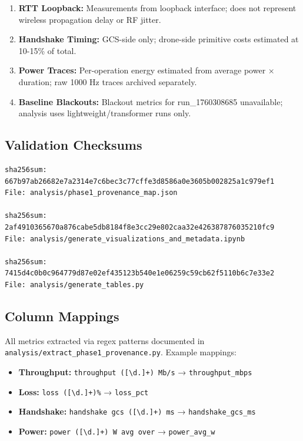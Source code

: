 \documentclass[11pt,a4paper]{article}
\begin{document}
\begin{enumerate}
    \item \textbf{RTT Loopback:} Measurements from loopback interface; does not represent wireless propagation delay or RF jitter.
    \item \textbf{Handshake Timing:} GCS-side only; drone-side primitive costs estimated at 10-15\% of total.
    \item \textbf{Power Traces:} Per-operation energy estimated from average power × duration; raw 1000 Hz traces archived separately.
    \item \textbf{Baseline Blackouts:} Blackout metrics for run\_1760308685 unavailable; analysis uses lightweight/transformer runs only.
\end{enumerate}

\subsection{Validation Checksums}

\begin{verbatim}
sha256sum: 667b97ab26682e7a2314e7c6bec3c77cffe3d8586a0e3605b002825a1c979ef1
File: analysis/phase1_provenance_map.json

sha256sum: 2af4910365670a876cabe5db8184f8e3cc29e802caa32e426387876035210fc9
File: analysis/generate_visualizations_and_metadata.ipynb

sha256sum: 7415d4c0b0c964779d87e02ef435123b540e1e06259c59cb62f5110b6c7e33e2
File: analysis/generate_tables.py
\end{verbatim}

\subsection{Column Mappings}

All metrics extracted via regex patterns documented in \texttt{analysis/extract\_phase1\_provenance.py}. Example mappings:
\begin{itemize}
    \item \textbf{Throughput:} \texttt{throughput ([\textbackslash d.]+) Mb/s} → \texttt{throughput\_mbps}
    \item \textbf{Loss:} \texttt{loss ([\textbackslash d.]+)\%} → \texttt{loss\_pct}
    \item \textbf{Handshake:} \texttt{handshake gcs ([\textbackslash d.]+) ms} → \texttt{handshake\_gcs\_ms}
    \item \textbf{Power:} \texttt{power ([\textbackslash d.]+) W avg over} → \texttt{power\_avg\_w}
\end{itemize}
\end{document}
